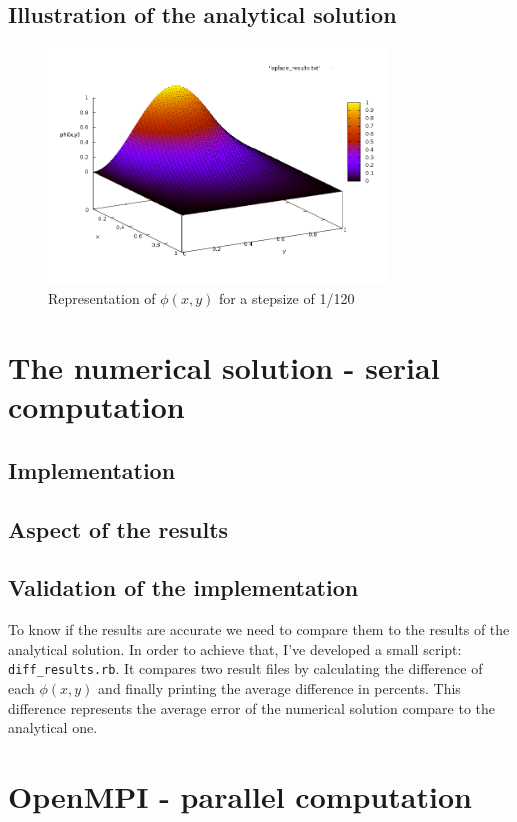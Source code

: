 \documentclass[a4paper,11pt]{article}
\begin{document}
\subsection{Illustration of the analytical solution}

\begin{figure}[h!]
  \centering
  \includegraphics[width=0.8\textwidth]{images/analytical.png}
  \caption{Representation of $\phi(x,y)$ for a stepsize of 1/120}
\end{figure}

\section{The numerical solution - serial computation}
\subsection{Implementation}

\subsection{Aspect of the results}

\subsection{Validation of the implementation}

To know if the results are accurate we need to compare them to the results of the analytical solution. In order to
achieve that, I've developed a small script: \texttt{diff\_results.rb}. It compares two result files by calculating the
difference of each $\phi(x,y)$ and finally printing the average difference in percents. This difference represents the
average error of the numerical solution compare to the analytical one.

\section{OpenMPI - parallel computation}
\end{document}
